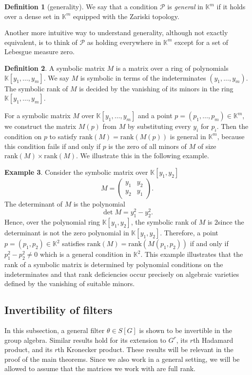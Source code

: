 \documentclass[final]{article}
\newcommand{\K}{\mathbb{K}}
\newcommand{\rank}{\text{rank}}
\theoremstyle{definition}
\newtheorem{definition}{Definition}[section] %
\newtheorem{example}[definition]{Example}
\theoremstyle{plain}
\begin{document}
\begin{definition}[generality]
    We say that a condition $\mathcal{P}$ is \emph{general} in $\K^m$ if it holds over a dense set in $\K^m$ equipped with the Zariski topology. 
\end{definition}

Another more intuitive way to understand generality, although not exactly equivalent, is to think of $\mathcal{P}$ as holding everywhere in  $\K^m$ except for a set of Lebesgue measure zero. 


\begin{definition}
    A symbolic matrix $M$ is a matrix over a ring of polynomials $\K[y_1, \dots, y_m]$.
    We say $M$ is symbolic in terms of the indeterminates $(y_1, \dots, y_m)$.
    The symbolic rank of $M$ is decided by the vanishing of its minors in the ring $\K[y_1, \dots, y_m]$.
\end{definition}
For a symbolic matrix $M$ over $\K[y_1, \dots, y_m]$ and a point $p=(p_1, \dots, p_m) \in \K^m$, we construct the matrix $M(p)$ from $M$ by substituting every $y_i$ for $p_i$.
Then the condition on $p$ to satisfy $\rank(M) = \rank(M(p))$ is general in $\K^m$, because this condition fails if and only if $p$ is the zero of all minors of $M$ of size $\rank(M) \times \rank(M)$.
We illustrate this in the following example.


\begin{example}
Consider the symbolic matrix  over $\K[y_1,y_2]$
\[
M=
\begin{pmatrix}
y_1 & y_2 \\
y_2 & y_1
\end{pmatrix}
.
\]
The determinant of \(M\) is the polynomial
\[
\det M = y_1^2 - y_2^2.
\]
Hence, over the polynomial ring \(\K[y_1,y_2]\), the symbolic rank of \(M\) is \(2\)since the determinant is not the zero polynomial in $\K[y_1, y_2]$. Therefore, a point $p=(p_1, p_2) \in \K^2$ satisfies $\rank(M) = \rank(M(p_1, p_2))$ if and only if $p_1^2 - p_2^2 \neq 0$ which is a general condition in $\K^2$.
This example illustrates that the rank of a symbolic matrix is determined by polynomial conditions on the indeterminates and that rank deficiencies occur precisely on algebraic varieties defined by the vanishing of suitable minors.
\end{example}




\subsection{Invertibility of filters}
In this subsection, a general filter $\theta\in S[G]$ is shown to be invertible in the group algebra.
Similar results hold for its extension to $G^r$, its $r$th Hadamard product, and its $r$th Kronecker product. 
These results will be relevant in the proof of the main theorems. Since we also work in a general setting, we will be allowed to assume that the matrices we work with are full rank.
\end{document}
